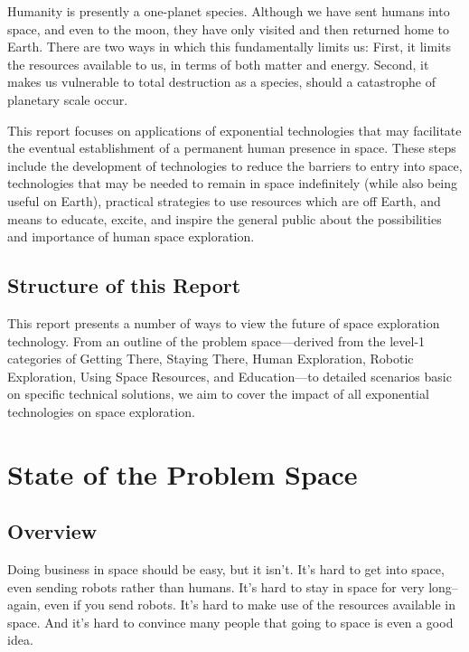 \documentclass[letter,11pt]{article}
\begin{document}
Humanity is presently a one-planet species. Although we have sent
humans into space, and even to the moon, they have only visited and
then returned home to Earth. There are two ways in which this
fundamentally limits us: First, it limits the resources available to
us, in terms of both matter and energy. Second, it makes us vulnerable
to total destruction as a species, should a catastrophe of planetary
scale occur.

This report focuses on applications of exponential technologies that
may facilitate the eventual establishment of a permanent human
presence in space. These steps include the development of technologies
to reduce the barriers to entry into space, technologies that may be
needed to remain in space indefinitely (while also being useful on
Earth), practical strategies to use resources which are off Earth, and
means to educate, excite, and inspire the general public about the
possibilities and importance of human space exploration.

\subsection{Structure of this Report}

This report presents a number of ways to view the future of space exploration
technology. From an outline of the problem space---derived from the level-1
categories of  Getting There, Staying There, Human Exploration, Robotic
Exploration, Using Space Resources, and Education---to detailed scenarios basic
on specific technical solutions, we aim to cover the impact of all exponential
technologies on space exploration.

\section{State of the Problem Space}

\subsection{Overview}

Doing business in space should be easy, but it isn't. It's hard to get into
space, even sending robots rather than humans. It's hard to stay in space for
very long--again, even if you send robots.  It's hard to make use of the
resources available in space. And it's hard to convince many people that going
to space is even a good idea.
\end{document}
